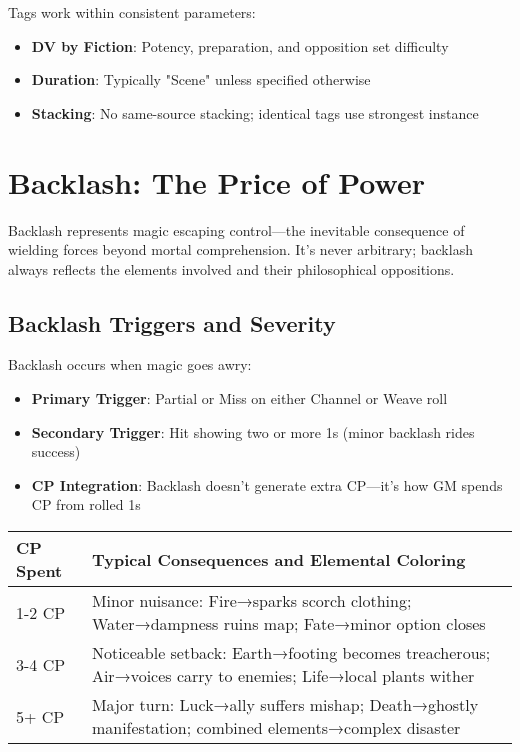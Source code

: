 Tags work within consistent parameters:
\begin{itemize}
    \item \textbf{DV by Fiction}: Potency, preparation, and opposition set difficulty
    \item \textbf{Duration}: Typically "Scene" unless specified otherwise
    \item \textbf{Stacking}: No same-source stacking; identical tags use strongest instance
\end{itemize}

\section*{Backlash: The Price of Power}

Backlash represents magic escaping control—the inevitable consequence of wielding forces beyond mortal comprehension. It's never arbitrary; backlash always reflects the elements involved and their philosophical oppositions.

\subsection*{Backlash Triggers and Severity}

Backlash occurs when magic goes awry:
\begin{itemize}
    \item \textbf{Primary Trigger}: Partial or Miss on either Channel or Weave roll
    \item \textbf{Secondary Trigger}: Hit showing two or more 1s (minor backlash rides success)
    \item \textbf{CP Integration}: Backlash doesn't generate extra CP—it's how GM spends CP from rolled 1s
\end{itemize}

\begin{fatebox}
\begin{tabularx}{\textwidth}{lX}
\toprule
\textbf{CP Spent} & \textbf{Typical Consequences and Elemental Coloring} \\
\midrule
1-2 CP & Minor nuisance: Fire→sparks scorch clothing; Water→dampness ruins map; Fate→minor option closes \\
3-4 CP & Noticeable setback: Earth→footing becomes treacherous; Air→voices carry to enemies; Life→local plants wither \\
5+ CP & Major turn: Luck→ally suffers mishap; Death→ghostly manifestation; combined elements→complex disaster \\
\bottomrule
\end{tabularx}
\end{fatebox}

